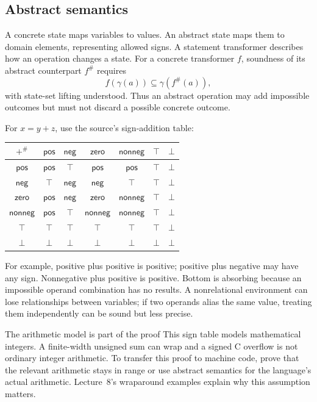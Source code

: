 \documentclass[11pt,a4paper]{article}
\numberwithin{figure}{section}
\begin{document}
\subsection{Abstract semantics}
A concrete state maps variables to values. An abstract state maps them to domain elements, representing allowed signs. A statement transformer describes how an operation changes a state. For a concrete transformer $f$, soundness of its abstract counterpart $f^\#$ requires
\[
f(\gamma(a))\subseteq\gamma(f^\#(a)),
\]
with state-set lifting understood. Thus an abstract operation may add impossible outcomes but must not discard a possible concrete outcome.

For $x=y+z$, use the source's sign-addition table:
\begin{center}\small
\begin{tabular}{@{}c|cccccc@{}}\toprule
$+^\#$ & $\mathsf{pos}$ & $\mathsf{neg}$ & $\mathsf{zero}$ & $\mathsf{nonneg}$ & $\top$ & $\bot$\\\midrule
$\mathsf{pos}$ & $\mathsf{pos}$ & $\top$ & $\mathsf{pos}$ & $\mathsf{pos}$ & $\top$ & $\bot$\\
$\mathsf{neg}$ & $\top$ & $\mathsf{neg}$ & $\mathsf{neg}$ & $\top$ & $\top$ & $\bot$\\
$\mathsf{zero}$ & $\mathsf{pos}$ & $\mathsf{neg}$ & $\mathsf{zero}$ & $\mathsf{nonneg}$ & $\top$ & $\bot$\\
$\mathsf{nonneg}$ & $\mathsf{pos}$ & $\top$ & $\mathsf{nonneg}$ & $\mathsf{nonneg}$ & $\top$ & $\bot$\\
$\top$ & $\top$ & $\top$ & $\top$ & $\top$ & $\top$ & $\bot$\\
$\bot$ & $\bot$ & $\bot$ & $\bot$ & $\bot$ & $\bot$ & $\bot$\\\bottomrule
\end{tabular}\end{center}
For example, positive plus positive is positive; positive plus negative may have any sign. Nonnegative plus positive is positive. Bottom is absorbing because an impossible operand combination has no results. A nonrelational environment can lose relationships between variables; if two operands alias the same value, treating them independently can be sound but less precise.

\begin{technical}{The arithmetic model is part of the proof}
This sign table models mathematical integers. A finite-width unsigned sum can wrap and a signed C overflow is not ordinary integer arithmetic. To transfer this proof to machine code, prove that the relevant arithmetic stays in range or use abstract semantics for the language's actual arithmetic. Lecture~8's wraparound examples explain why this assumption matters.
\end{technical}
\end{document}
